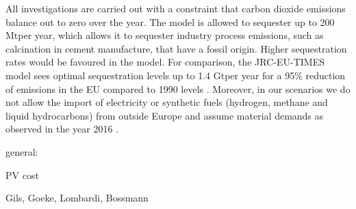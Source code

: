 
All investigations are carried out with a constraint that carbon dioxide
emissions balance out to zero over the year. The model is allowed to sequester
up to 200 Mt\co per year, which allows it to sequester industry process
emissions, such as calcination in cement manufacture, that have a fossil origin.
Higher sequestration rates would be favoured in the model. For comparison, the
JRC-EU-TIMES model sees optimal sequestration levels up to 1.4 Gt\co per year
for a 95\% reduction of \co emissions in the EU compared to 1990 levels
\cite{blancoPotentialHydrogen2018}. Moreover, in our scenarios we do not allow
the import of electricity or synthetic fuels (hydrogen, methane and liquid
hydrocarbons) from outside Europe and assume material demands as observed in the
year 2016 \cite{IDEES}.

general:
\cite{
    mckennaScenicnessAssessment2021,
    krummModellingSocial2022,
    weinandImpactPublic2021,
    weinandExploringTrilemma,
    trondleTradeOffsGeographic2020,
    sasseDistributionalTradeoffs2019,
    sasseRegionalImpacts2020,
    ludererImpactDeclining2021,
    EuropeanHydrogen,
    victoria2020,
    victoriaSpeedTechnological2021,
    lombardiPolicyDecision2020,
    tsiropoulosNetzeroEmissions2020,
    europeancommission.directorategeneralforenergy.METISStudy2021,
    deutschNoRegretHydrogen,
    tafarteQuantifyingTrade,
    lehmannManagingSpatial}

PV cost
\cite{
    jaxa-rozenSourcesUncertainty2021,
    victoriaSolarPhotovoltaics2021,
    xiaoPlummetingCosts2021}

Gils, Goeke, Lombardi, Bossmann